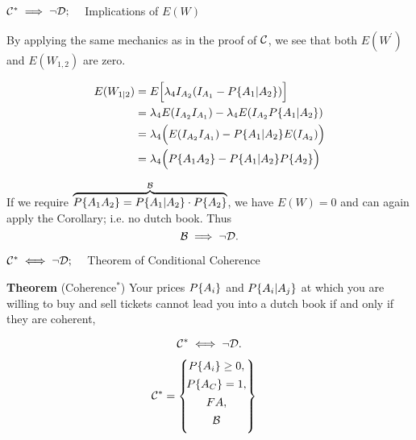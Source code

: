 \begin{frame}{$\mathcal{C}^*\implies\neg\mathcal{D};\quad$ Implications of $E(W)$}
\begin{minipage}{\linewidth}
\begin{minipage}{0.3\linewidth}
By applying the same mechanics as in the proof of $\mathcal{C}$, we see that both $E(W^\prime)$ and $E(W_{1,2})$ are zero.
\end{minipage}
\hfill
\begin{minipage}{0.65\linewidth}
\begingroup
\setlength{\abovedisplayskip}{3pt}
\setlength{\belowdisplayskip}{3pt}
\begin{equation*}
\begin{split}
E(W_{1|2})&=E\Big[\lambda_4I_{A_2}(I_{A_1}-P\{A_1|A_2\})\Big]\\
&=\lambda_4E(I_{A_2}I_{A_1})-\lambda_4E(I_{A_2}P\{A_1|A_2\})\\
&=\lambda_4\Big(E(I_{A_2}I_{A_1})-P\{A_1|A_2\}E(I_{A_2})\Big)\\
&=\lambda_4\Big(P\{A_1A_2\}-P\{A_1|A_2\}P\{A_2\}\Big)
\end{split}
\end{equation*}
\endgroup
\end{minipage}
\vfill

\end{minipage}
\vfill
\begin{minipage}{\linewidth}
If we require $\overbrace{P\{A_1A_2\}=P\{A_1|A_2\}\cdot P\{A_2\}}^{\mathcal{B}}$, we have $E(W)=0$ and can again apply the Corollary; i.e. no dutch book. Thus
$$\mathcal{B}\implies\neg\mathcal{D}.$$
\end{minipage}
\end{frame}

\begin{frame}{$\mathcal{C}^*\iff\neg\mathcal{D};\quad$ Theorem of Conditional Coherence}
\begin{minipage}[]{0.5\linewidth}
{\textbf{Theorem} (Coherence$^*$)}
Your prices $P\{A_i\}$ and $P\{A_i|A_j\}$ at which you are willing to buy and sell tickets cannot lead you into a dutch book if and only if they are coherent,

$$\mathcal{C}^*\iff\neg\mathcal{D}.$$
\end{minipage}
\hfill
\begin{minipage}[]{0.3\linewidth}
$$
\mathcal{C}^*
=
\left\{\!\begin{matrix}
P\{A_i\}\ge0, \\[1ex]
P\{A_{C}\}=1, \\[1ex]
FA,\\[1ex]
\mathcal{B}\\[1ex]
\end{matrix}\right\}
\quad
$$
\end{minipage}
\end{frame}

